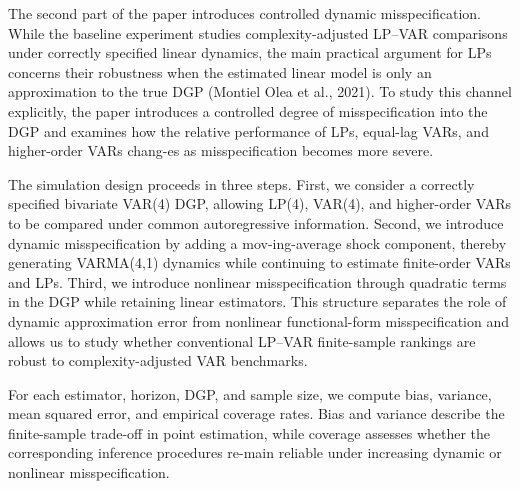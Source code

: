 The second part of the paper introduces controlled dynamic misspecification. While the baseline experiment studies complexity-adjusted LP–VAR comparisons under correctly specified linear dynamics, the main practical argument for LPs concerns their robustness when the estimated linear model is only an approximation to the true DGP (Montiel Olea et al., 2021). To study this channel explicitly, the paper introduces a controlled degree of misspecification into the DGP and examines how the relative performance of LPs, equal-lag VARs, and higher-order VARs chang-es as misspecification becomes more severe.

The simulation design proceeds in three steps.  First, we consider a correctly specified bivariate VAR(4) DGP, allowing LP(4), VAR(4), and higher-order VARs to be compared under common autoregressive information. Second, we introduce dynamic misspecification by adding a mov-ing-average shock component, thereby generating VARMA(4,1) dynamics while continuing to estimate finite-order VARs and LPs. Third, we introduce nonlinear misspecification through quadratic terms in the DGP while retaining linear estimators. This structure separates the role of dynamic approximation error from nonlinear functional-form misspecification and allows us to study whether conventional LP–VAR finite-sample rankings are robust to complexity-adjusted VAR benchmarks.

For each estimator, horizon, DGP, and sample size, we compute bias, variance, mean squared error, and empirical coverage rates. Bias and variance describe the finite-sample trade-off in point estimation, while coverage assesses whether the corresponding inference procedures re-main reliable under increasing dynamic or nonlinear misspecification.

\FloatBarrier